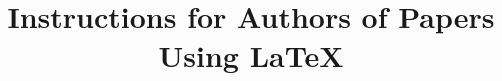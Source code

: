 \documentclass{scspaperproc}
\theoremstyle{scsthe}
\begin{document}
%
%




\def\SCSconferenceacro{SpringSim'20}

\def\SCSpublicationyear{2020}

\def\SCSconferencedates{May 19-May 21}

\def\SCSconferencevenue{Fairfax, VA, USA}

\title{Instructions for Authors of Papers Using \LaTeX}
\end{document}
